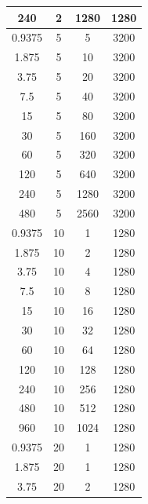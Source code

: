 \documentclass[a4paper, 12pt]{article}
\begin{document}
\begin{longtable}[c]{|c|c|c|c|}
240        & 2               & 1280           & 1280    \\ \hline
0.9375     & 5               & 5              & 3200    \\ \hline
1.875      & 5               & 10             & 3200    \\ \hline
3.75       & 5               & 20             & 3200    \\ \hline
7.5        & 5               & 40             & 3200    \\ \hline
15         & 5               & 80             & 3200    \\ \hline
30         & 5               & 160            & 3200    \\ \hline
60         & 5               & 320            & 3200    \\ \hline
120        & 5               & 640            & 3200    \\ \hline
240        & 5               & 1280           & 3200    \\ \hline
480        & 5               & 2560           & 3200    \\ \hline
0.9375     & 10              & 1              & 1280    \\ \hline
1.875      & 10              & 2              & 1280    \\ \hline
3.75       & 10              & 4              & 1280    \\ \hline
7.5        & 10              & 8              & 1280    \\ \hline
15         & 10              & 16             & 1280    \\ \hline
30         & 10              & 32             & 1280    \\ \hline
60         & 10              & 64             & 1280    \\ \hline
120        & 10              & 128            & 1280    \\ \hline
240        & 10              & 256            & 1280    \\ \hline
480        & 10              & 512            & 1280    \\ \hline
960        & 10              & 1024           & 1280    \\ \hline
0.9375     & 20              & 1              & 1280    \\ \hline
1.875      & 20              & 1              & 1280    \\ \hline
3.75       & 20              & 2              & 1280    \\ \hline

\end{longtable}
\end{document}
